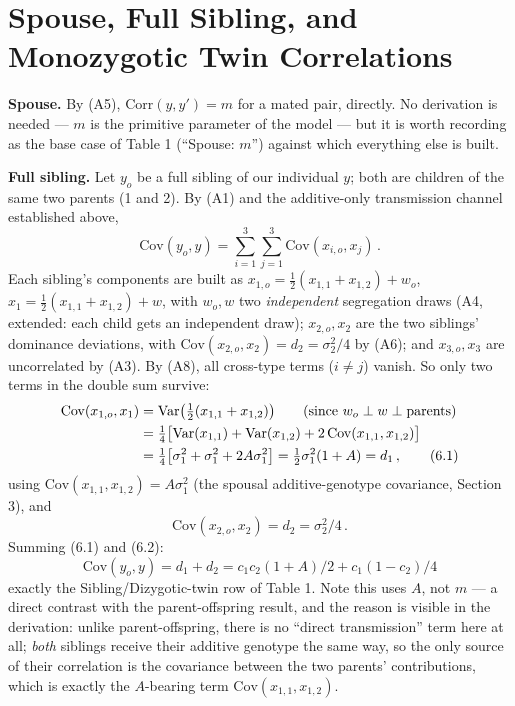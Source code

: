 \documentclass[12pt]{article}
\begin{document}
\section{Spouse, Full Sibling, and Monozygotic Twin Correlations}

\textbf{Spouse.} By (A5), $\mathrm{Corr}(y,y')=m$ for a mated pair, directly. No derivation is needed — $m$ is the primitive parameter of the model — but it is worth recording as the base case of Table 1 (``Spouse: $m$'') against which everything else is built.

\textbf{Full sibling.} Let $y_o$ be a full sibling of our individual $y$; both are children of the same two parents (1 and 2). By (A1) and the additive-only transmission channel established above,
\begin{equation}
\mathrm{Cov}(y_o,y) = \sum_{i=1}^{3}\sum_{j=1}^{3}\mathrm{Cov}(x_{i,o},x_j) \, .
\end{equation}
Each sibling's components are built as $x_{1,o}=\tfrac12(x_{1,1}+x_{1,2})+w_o$, $x_1=\tfrac12(x_{1,1}+x_{1,2})+w$, with $w_o,w$ two \emph{independent} segregation draws (A4, extended: each child gets an independent draw); $x_{2,o},x_2$ are the two siblings' dominance deviations, with $\mathrm{Cov}(x_{2,o},x_2)=d_2=\sigma_2^2/4$ by (A6); and $x_{3,o},x_3$ are uncorrelated by (A3). By (A8), all cross-type terms ($i\ne j$) vanish. So only two terms in the double sum survive:
\begin{align}
\mathrm{Cov}(x_{1,o},x_1) &= \mathrm{Var}\big(\tfrac12(x_{1,1}+x_{1,2})\big) \qquad (\text{since } w_o\perp w\perp\text{parents}) \notag \\
&= \tfrac14\big[\mathrm{Var}(x_{1,1})+\mathrm{Var}(x_{1,2})+2\,\mathrm{Cov}(x_{1,1},x_{1,2})\big] \notag \\
&= \tfrac14\big[\sigma_1^2+\sigma_1^2+2A\sigma_1^2\big] = \tfrac12\sigma_1^2(1+A) = d_1 \, , \tag{6.1}
\end{align}
using $\mathrm{Cov}(x_{1,1},x_{1,2})=A\sigma_1^2$ (the spousal additive-genotype covariance, Section 3), and
\begin{equation}
\mathrm{Cov}(x_{2,o},x_2) = d_2 = \sigma_2^2/4 \, . \tag{6.2}
\end{equation}
Summing (6.1) and (6.2):
\begin{equation}
\boxed{\mathrm{Cov}(y_o,y) = d_1+d_2 = c_1c_2(1+A)/2 + c_1(1-c_2)/4}
\end{equation}
exactly the Sibling/Dizygotic-twin row of Table 1. Note this uses $A$, not $m$ — a direct contrast with the parent-offspring result, and the reason is visible in the derivation: unlike parent-offspring, there is no ``direct transmission'' term here at all; \emph{both} siblings receive their additive genotype the same way, so the only source of their correlation is the covariance between the two parents' contributions, which is exactly the $A$-bearing term $\mathrm{Cov}(x_{1,1},x_{1,2})$.
\end{document}
